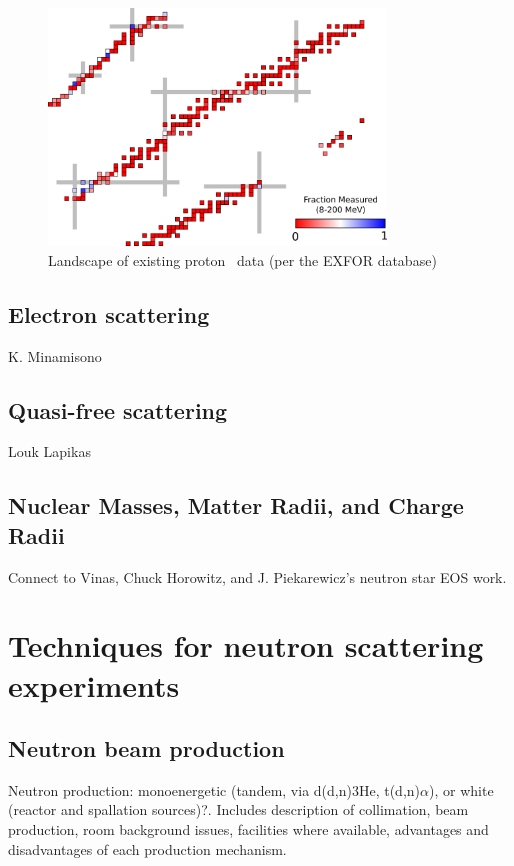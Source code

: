 \begin{eqation}
\begin{figure}
    \includegraphics[width=0.8\textwidth]{figures/RCSChart.png}
    \caption{Landscape of existing proton \rxn\ data (per the EXFOR database)}
    \label{RCSChart}
\end{figure}

\subsection{Electron scattering}
K. Minamisono


\subsection{Quasi-free scattering}
Louk Lapikas

\subsection{Nuclear Masses, Matter Radii, and Charge Radii}
Connect to Vinas, Chuck Horowitz, and J. Piekarewicz's neutron star EOS work.

\section{Techniques for neutron scattering experiments}
\subsection{Neutron beam production}
Neutron production: monoenergetic (tandem, via d(d,n)3He, t(d,n)$\alpha$),
or white (reactor and spallation sources)?. Includes description of
collimation, beam production, room background issues, facilities where
available, advantages and disadvantages of each production mechanism.


\end{eqation}
